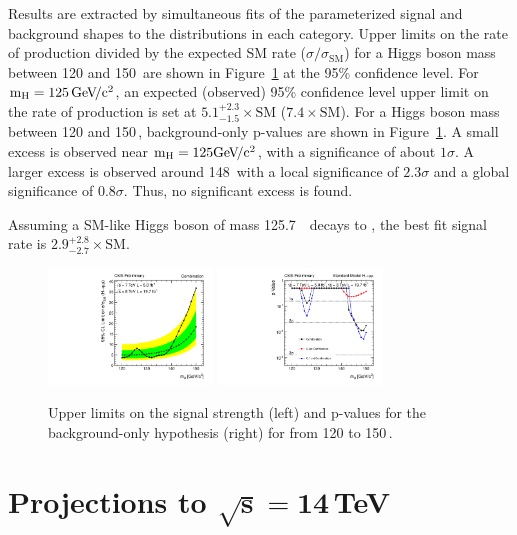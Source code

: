 \documentclass[10pt]{article}
\begin{document}
Results are extracted by simultaneous fits of the parameterized signal and background shapes
to the \Mmumu{} distributions in each category.  Upper limits
on the rate of \hmm{} production divided by the expected SM \hmm{} rate ($\sigma/\sigma_\mathrm{SM}$) 
for a Higgs boson mass between 120 and 150\,\GeVcc{} are shown in Figure~\ref{fig:results} at 
the 95\% confidence level.  
For $\mathrm{m_H}{}=125\,\mathrm{Ge\kern -0.1em V\!/c^2}{}$, an expected (observed) 95\% confidence level upper limit
on the rate of \hmm{} production is set at 
$5.1^{+2.3}_{-1.5}\times\mathrm{SM}$ ($7.4\times\mathrm{SM}$).
For a Higgs boson mass between 120 and 150\,\GeVcc{}, background-only p-values are shown
in Figure~\ref{fig:results}.  A small excess is observed near $\mathrm{m_H}{}=125\mathrm{Ge\kern -0.1em V\!/c^2}{}$, with
a significance of about $1\sigma$.  A larger excess is observed around 148\,\GeVcc{}
with a local significance of $2.3\sigma$ and a global significance
of $0.8\sigma$.  Thus, no significant excess is found.

Assuming a SM-like Higgs boson of mass 125.7\,\GeVcc{}~\cite{CMS:yva} decays to \mm{},
the best fit signal rate is $2.9^{+2.8}_{-2.7}\times\mathrm{SM}$.

\begin{figure}[htb]
\centering
\includegraphics[width=0.39\textwidth]{plotsPublic/limits_annalysisA/pdf/CombSplitAll_7P8TeV.pdf}
\includegraphics[width=0.39\textwidth]{plotsPublic/pValues_analysisA/pdf/pValues_Final7P8TeV.pdf}
\caption{ Upper limits on the signal strength (left) and p-values for the 
            background-only hypothesis (right) for \mh{} from 120 to 150\,\GeVcc{}.}
\label{fig:results}
\end{figure}

\section{Projections to $\mathbf{\sqrt{s}=14}$\,TeV}
\end{document}
